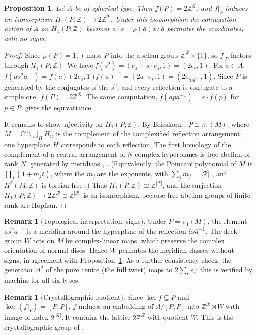 \documentclass[11pt]{amsart}
\newtheorem{proposition}[theorem]{Proposition}
\theoremstyle{definition}
\newtheorem{remark}[theorem]{Remark}
\newcommand{\Z}{\mathbb{Z}}
\newcommand{\C}{\mathbb{C}}
\newcommand{\R}{\mathcal{R}}
\begin{document}
\begin{proposition}\label{prop:H1}
Let $A$ be of spherical type. Then $f(P)=2\Z^\R$, and $f|_P$ induces an isomorphism $H_1(P;\Z)\to2\Z^\R$. Under
this isomorphism the conjugation action of $A$ on $H_1(P;\Z)$ becomes $a\cdot x=\rho(\bar a)x$: $\bar a$ permutes
the coordinates, with no signs.
\end{proposition}

\begin{proof}
Since $\mu(P)=1$, $f$ maps $P$ into the abelian group $\Z^\R\times\{1\}$, so $f|_P$ factors through $H_1(P;\Z)$.
We have $f(s^2)=(e_s+s\cdot e_s,1)=(2e_s,1)$. For $a\in A$,
$f(as^2a^{-1})=f(a)(2e_s,1)f(a)^{-1}=(2\bar a\cdot e_s,1)=(2e_{\bar as\bar a^{-1}},1)$. Since $P$ is generated by
the conjugates of the $s^2$, and every reflection is conjugate to a simple one, $f(P)=2\Z^\R$. The same
computation, $f(apa^{-1})=\bar a\cdot f(p)$ for $p\in P$, gives the equivariance.

It remains to show injectivity on $H_1(P;\Z)$. By Brieskorn \cite{Bri71}, $P\cong\pi_1(M)$, where $M=\C^n\setminus\bigcup_{H}H_\C$ is the complement of the
complexified reflection arrangement; one hyperplane $H$ corresponds to each reflection. The first homology of the complement
of a central arrangement of $N$ complex hyperplanes is free abelian of rank $N$, generated by meridians
\cite{Bri73}, \cite[Ch.~5]{OT92}. (Equivalently, the Poincar\'e polynomial of $M$ is $\prod_j(1+m_jt)$, where the
$m_j$ are the exponents, with $\sum_j m_j=|\R|$ \cite{Bri73}, and $H^*(M;\Z)$ is torsion-free \cite[Ch.~5]{OT92}.)
Thus $H_1(P;\Z)\cong\Z^{|\R|}$, and the surjection $H_1(P;\Z)\to2\Z^\R\cong\Z^{|\R|}$ is an isomorphism, because
free abelian groups of finite rank are Hopfian.
\end{proof}

\begin{remark}[Topological interpretation; signs]
Under $P=\pi_1(M)$, the element $as^2a^{-1}$ is a meridian around the hyperplane of the reflection
$\bar as\bar a^{-1}$. The deck group $W$ acts on $M$ by complex-linear maps, which preserve the complex orientation
of normal discs. Hence $W$ permutes the meridian classes without signs, in agreement with
Proposition~\ref{prop:H1}. As a further consistency check, the generator $\Delta^2$ of the pure centre (the full
twist) maps to $2\sum_re_r$; this is verified by machine for all six types.
\end{remark}

\begin{remark}[Crystallographic quotient]\label{rem:cryst}
Since $\ker f\subseteq P$ and $\ker(f|_P)=[P,P]$, $f$ induces an embedding of $A/[P,P]$ into $\Z^\R\rtimes W$ with
image of index $2^{|\R|}$. It contains the lattice $2\Z^\R$ with quotient $W$. This is the crystallographic group of
\cite{GGO17,Mar15}.
\end{remark}
\end{document}
